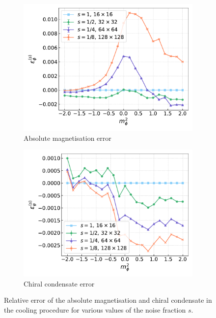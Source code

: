 \begin{figure}[htp]
    \centering
    \begin{subfigure}[b]{0.48\textwidth}
        \includegraphics[width=1.0\textwidth]{figures/cooling/mass_scan/deviation.pdf}
        \caption{Absolute magnetisation error}
    \end{subfigure}
    \begin{subfigure}[b]{0.48\textwidth}
        \includegraphics[width=1.0\textwidth]{figures/cooling/mass_scan/deviation_cond.pdf}
        \caption{Chiral condensate error}
    \end{subfigure}
    \caption[Relative error in the cooling procedure at tree level.]{Relative error of the absolute magnetisation and chiral condensate in the cooling procedure for various values of the noise fraction $s$.}
    \label{fig:cooling_deviation}
\end{figure}
